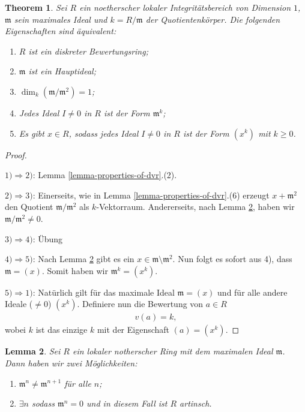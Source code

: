 \documentclass[reqno,12pt]{article}
\numberwithin{equation}{section}
\theoremstyle{plain}
\newtheorem{thm}{Theorem}[section]
\newtheorem{lemma}[thm]{Lemma}
\theoremstyle{definition}
\begin{document}
\begin{thm}
Sei $R$ ein noetherscher lokaler Integritätsbereich von Dimension $1$, $\mathfrak{m}$ sein maximales Ideal und $k = R/\mathfrak{m}$ der Quotientenkörper. Die folgenden Eigenschaften sind äquivalent:
\begin{enumerate}
\item $R$ ist ein diskreter Bewertungsring;
\item $\mathfrak{m}$ ist ein Hauptideal;
\item $\dim_k (\mathfrak{m} / \mathfrak{m}^2) = 1$;
\item Jedes Ideal $I \neq 0$ in $R$ ist der Form $\mathfrak{m}^k$;
\item Es gibt $x \in R$, sodass jedes Ideal $I \neq 0$ in $R$ ist der Form $(x^k)$ mit $k \geq 0$.
\end{enumerate}
\end{thm}


\begin{proof}
\

$1) \Rightarrow 2)$: Lemma \ref{lemma-properties-of-dvr}.(2).

\smallskip

$2) \Rightarrow 3)$: Einerseits, wie in Lemma \ref{lemma-properties-of-dvr}.(6)
erzeugt $x + \mathfrak{m}^2$ den Quotient $\mathfrak{m} / \mathfrak{m}^2$ als $k$-Vektorraum.
Andererseits, nach Lemma \ref{lemma-powers-of-maximal-ideal}, haben wir $\mathfrak{m} / \mathfrak{m}^2 \neq 0$.

\smallskip

$3) \Rightarrow 4)$: Übung \smiley{}
\smallskip

$4) \Rightarrow 5)$: Nach Lemma \ref{lemma-powers-of-maximal-ideal} gibt es ein $x \in \mathfrak{m} \setminus \mathfrak{m}^2$. Nun folgt es sofort aus 4), dass $\mathfrak{m} = (x)$. Somit haben wir $\mathfrak{m}^k = (x^k)$.

\smallskip

$5) \Rightarrow 1)$: Natürlich gilt für das maximale Ideal $\mathfrak{m}=(x)$ und für alle andere Ideale ($\neq 0$) $(x^k)$. Definiere nun die Bewertung von $a \in R$
\begin{align*}
v(a) = k,
\end{align*}
wobei $k$ ist das einzige $k$ mit der Eigenschaft $(a)=(x^k)$.
\end{proof}



\begin{lemma}\label{lemma-powers-of-maximal-ideal}
Sei $R$ ein lokaler notherscher Ring mit dem maximalen Ideal $\mathfrak{m}$. Dann haben wir zwei Möglichkeiten:
\begin{enumerate}
\item $\mathfrak{m}^n \neq \mathfrak{m}^{n+1}$   für alle $n$;
\item $\exists n$ sodass $\mathfrak{m}^n = 0$ und in diesem Fall ist $R$ artinsch.
\end{enumerate}
\end{lemma}
\end{document}
